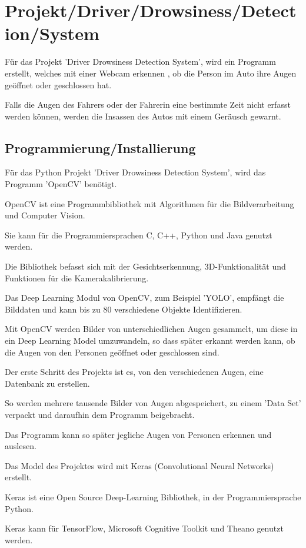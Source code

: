 \section{Projekt/Driver/Drowsiness/Detection/System}

Für das Projekt 'Driver Drowsiness Detection System', wird ein Programm erstellt, welches mit einer Webcam erkennen , ob die Person im Auto ihre Augen geöffnet oder geschlossen hat.

Falls die Augen des Fahrers oder der Fahrerin eine 
bestimmte Zeit nicht erfasst werden können, werden die Insassen des Autos mit einem Geräusch gewarnt.

\subsection{Programmierung/Installierung}

Für das Python Projekt 'Driver Drowsiness Detection System', wird das Programm 'OpenCV' benötigt. 

OpenCV ist eine Programmbibliothek mit Algorithmen für die Bildverarbeitung und Computer Vision.

Sie kann für die Programmiersprachen C, C++, Python und Java genutzt werden.

Die Bibliothek befasst sich mit der Gesichtserkennung, 3D-Funktionalität und Funktionen für die Kamerakalibrierung.

Das Deep Learning Modul von OpenCV, zum Beispiel 'YOLO', empfängt die Bilddaten und kann bis zu 80 verschiedene Objekte Identifizieren.

Mit OpenCV werden Bilder von unterschiedlichen Augen gesammelt, um diese in ein Deep Learning Model umzuwandeln, so dass später erkannt werden kann, ob die Augen von den Personen geöffnet oder geschlossen sind.

Der erste Schritt des Projekts ist es, von den verschiedenen Augen, eine Datenbank zu erstellen.

So werden mehrere tausende Bilder von Augen 
abgespeichert, zu einem 'Data Set' verpackt und daraufhin dem Programm beigebracht. 

Das Programm kann so später jegliche Augen von Personen erkennen und auslesen.   


Das Model des Projektes wird mit Keras (Convolutional Neural Networks) erstellt. 

Keras ist eine Open Source Deep-Learning Bibliothek, in der Programmiersprache Python.

Keras kann für TensorFlow, Microsoft Cognitive Toolkit und Theano genutzt werden.



